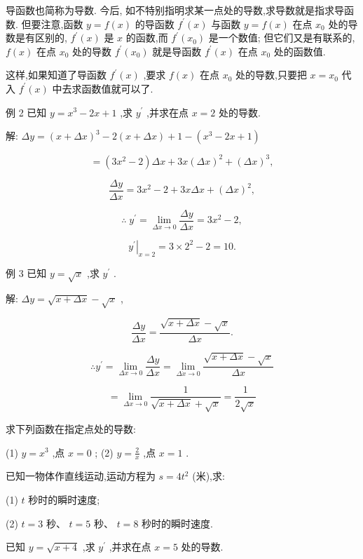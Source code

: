 \documentclass[lang=cn,newtx,10pt,scheme=chinese]{elegantbook}
\begin{document}
导函数也简称为导数. 今后, 如不特别指明求某一点处的导数,求导数就是指求导函数. 但要注意,函数 \(y = f\left( x\right)\) 的导函数 \({f}^{\prime }\left( x\right)\) 与函数 \(y = f\left( x\right)\) 在点 \({x}_{0}\) 处的导数是有区别的, \({f}^{\prime }\left( x\right)\) 是 \(x\) 的函数,而 \({f}^{\prime }\left( {x}_{0}\right)\) 是一个数值; 但它们又是有联系的, \(f\left( x\right)\) 在点 \({x}_{0}\) 处的导数 \({f}^{\prime }\left( {x}_{0}\right)\) 就是导函数 \({f}^{\prime }\left( x\right)\) 在点 \({x}_{0}\) 处的函数值.

这样,如果知道了导函数 \({f}^{\prime }\left( x\right)\) ,要求 \(f\left( x\right)\) 在点 \({x}_{0}\) 处的导数,只要把 \(x = {x}_{0}\) 代入 \({f}^{\prime }\left( x\right)\) 中去求函数值就可以了.

例 2 已知 \(y = {x}^{3} - {2x} + 1\) ,求 \({y}^{\prime }\) ,并求在点 \(x = 2\) 处的导数.

解: \({\Delta y} = {\left( x + \Delta x\right) }^{3} - 2\left( {x + {\Delta x}}\right) + 1 - \left( {{x}^{3} - {2x} + 1}\right)\)

\[
= \left( {3{x}^{2} - 2}\right) {\Delta x} + {3x}{\left( \Delta x\right) }^{2} + {\left( \Delta x\right) }^{3},
\]

\[
\frac{\Delta y}{\Delta x} = 3{x}^{2} - 2 + {3x\Delta x} + {\left( \Delta x\right) }^{2},
\]

\[
\therefore \;{y}^{\prime } = \mathop{\lim }\limits_{{{\Delta x} \rightarrow 0}}\frac{\Delta y}{\Delta x} = 3{x}^{2} - 2,
\]

\[
{\left. {y}^{\prime }\right| }_{x = 2} = 3 \times {2}^{2} - 2 = {10}.
\]

例 3 已知 \(y = \sqrt{x}\) ,求 \({y}^{\prime }\) .

解: \({\Delta y} = \sqrt{x + {\Delta x}} - \sqrt{x}\) ,

\[
\frac{\Delta y}{\Delta x} = \frac{\sqrt{x + {\Delta x}} - \sqrt{x}}{\Delta x}.
\]

\[
\therefore {y}^{\prime } = \mathop{\lim }\limits_{{{\Delta x} \rightarrow 0}}\frac{\Delta y}{\Delta x} = \mathop{\lim }\limits_{{\Delta \dot{x} \rightarrow 0}}\frac{\sqrt{x + {\Delta x}} - \sqrt{x}}{\Delta x}
\]

\[
= \mathop{\lim }\limits_{{{\Delta x} \rightarrow 0}}\frac{1}{\sqrt{x + {\Delta x}} + \sqrt{x}} = \frac{1}{2\sqrt{x}}
\]

\begin{problemset}[练习]

\item 求下列函数在指定点处的导数:

(1) \(y = {x}^{3}\) ,点 \(x = 0\) ; (2) \(y = \frac{2}{x}\) ,点 \(x = 1\) .

\item 已知一物体作直线运动,运动方程为 \(s = 4{t}^{2}\) (米),求:

(1) \(t\) 秒时的瞬时速度;

(2) \(t = 3\) 秒、 \(t = 5\) 秒、 \(t = 8\) 秒时的瞬时速度.

\item 已知 \(y = \sqrt{x + 4}\) ,求 \({y}^{\prime }\) ,并求在点 \(x = 5\) 处的导数.

\end{problemset}
\end{document}
